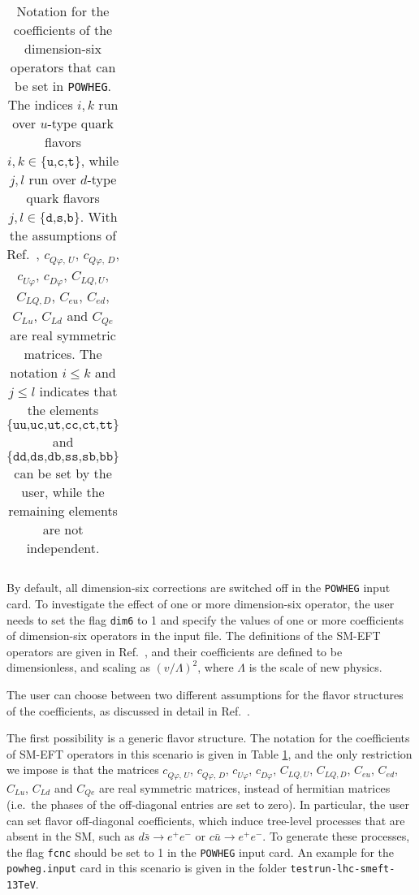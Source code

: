 \documentclass[paper]{JHEP3}
\newcommand\POWHEG{{\tt POWHEG}}
\begin{document}
\begin{table}
\begin{small}
\begin{tabular}{||c|cc||c|cc||}
\hline
\end{tabular}
\end{small}
\caption{Notation for the coefficients of the dimension-six operators that can be set in \POWHEG{}.
The indices $i, k$ run over $u$-type quark flavors $\textit{i},\textit{k} \in \{\texttt{u,c,t}\}$, while $j, l$ run over $d$-type quark flavors $\textit{j},\textit{l} \in \{\texttt{d,s,b}\}$.
With the assumptions of Ref.\ \cite{Alioli:2018ljm}, $c^{}_{Q\varphi,\, U}$, $c^{}_{Q\varphi,\, D}$, $c^{}_{U\varphi}$, $c^{}_{D\varphi}$, 
$C_{LQ,U}$, $C_{LQ,D}$, $C_{eu}$, $C_{ed}$, $C_{Lu}$, $C_{Ld}$ and $C_{Qe}$ are real symmetric matrices. The notation $i \le k$ and $j \le l$ indicates that the elements $\{\texttt{uu,uc,ut,cc,ct,tt}\}$ 
and $\{\texttt{dd,ds,db,ss,sb,bb}\}$ can be set by the user, while the remaining elements are not independent. }\label{TabA}
\end{table}


By default, all dimension-six corrections are switched off in the \POWHEG{} input card.
To investigate the effect of one or more dimension-six operator, the user  needs to set the flag \texttt{dim6} to 1 and specify the values of 
one or more coefficients of dimension-six operators in the input file. The definitions of the SM-EFT operators are given in Ref.\ \cite{Alioli:2018ljm},
and their coefficients are defined to be dimensionless, and scaling as $(v/\Lambda)^2$, where $\Lambda$ is the scale of new physics.

The user can choose between two different assumptions for the flavor structures of the coefficients, as discussed in detail in Ref.\ \cite{Alioli:2018ljm}.

The first possibility is a generic flavor structure. The notation for the coefficients of SM-EFT operators in this scenario is given in Table \ref{TabA},
and the only restriction we impose is that the matrices $c^{}_{Q\varphi,\, U}$, $c^{}_{Q\varphi,\, D}$, $c^{}_{U\varphi}$, $c^{}_{D\varphi}$, 
$C_{LQ,U}$, $C_{LQ,D}$, $C_{eu}$, $C_{ed}$, $C_{Lu}$, $C_{Ld}$ and $C_{Qe}$ are real symmetric matrices, instead of hermitian matrices (i.e.\ the phases of the off-diagonal 
entries are set to zero). In particular, the user can set flavor off-diagonal coefficients, which induce tree-level processes that are absent in the SM, such as $d \bar s \rightarrow e^+ e^-$ 
or $c \bar u \rightarrow  e^+ e^-$. To generate these processes, the flag \texttt{fcnc} should be set to 1 in the \POWHEG{} input card.   
An example for the \texttt{powheg.input}  card in this scenario is given in the folder \texttt{testrun-lhc-smeft-13TeV}.
\end{document}
